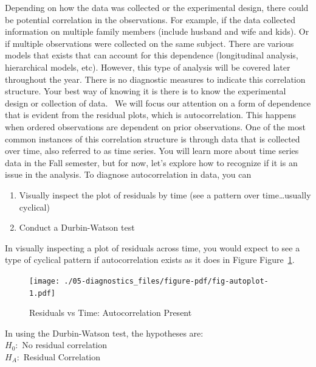 \documentclass[
  letterpaper,
  DIV=11,
  numbers=noendperiod]{scrreprt}
\providecommand{\tightlist}{%
  \setlength{\itemsep}{0pt}\setlength{\parskip}{0pt}}\usepackage{longtable,booktabs,array}
\begin{document}
Depending on how the data was collected or the experimental design,
there could be potential correlation in the observations. For example,
if the data collected information on multiple family members (include
husband and wife and kids). Or if multiple observations were collected
on the same subject. There are various models that exists that can
account for this dependence (longitudinal analysis, hierarchical models,
etc). However, this type of analysis will be covered later throughout
the year. There is no diagnostic measures to indicate this correlation
structure. Your best way of knowing it is there is to know the
experimental design or collection of data.~ We will focus our attention
on a form of dependence that is evident from the residual plots, which
is autocorrelation. This happens when ordered observations are dependent
on prior observations. One of the most common instances of this
correlation structure is through data that is collected over time, also
referred to as time series. You will learn more about time series data
in the Fall semester, but for now, let's explore how to recognize if it
is an issue in the analysis. To diagnose autocorrelation in data, you
can\\

\begin{enumerate}
\def\labelenumi{\arabic{enumi}.}
\tightlist
\item
  Visually inspect the plot of residuals by time (see a pattern over
  time\ldots usually cyclical)\\
\item
  Conduct a Durbin-Watson test\\
\end{enumerate}

In visually inspecting a plot of residuals across time, you would expect
to see a type of cyclical pattern if autocorrelation exists as it does
in Figure Figure~\ref{fig-autoplot}.

\begin{figure}

{\centering \texttt{[image: ./05-diagnostics\_files/figure-pdf/fig-autoplot-1.pdf]}

}

\caption{\label{fig-autoplot}Residuals vs Time: Autocorrelation Present}

\end{figure}

In using the Durbin-Watson test, the hypotheses are:\\
\(H_{0}:\) No residual correlation\\
\(H_{A}:\) Residual Correlation\\
\end{document}
